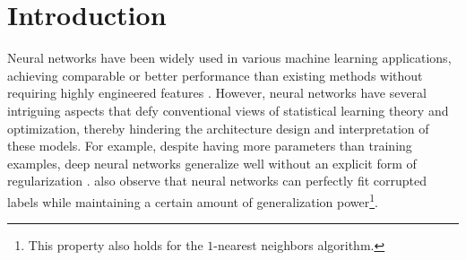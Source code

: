 \section{Introduction}

Neural networks have been widely used in various machine learning applications, achieving comparable or better performance than existing methods without requiring highly engineered features \citep{krizhevsky2012imagenet}. However, neural networks have several intriguing aspects that defy conventional views of statistical learning theory and optimization, thereby hindering the architecture design and interpretation of these models. For example, despite having more parameters than training examples, deep neural networks generalize well without an explicit form of regularization \citep{zhang2016understanding,neyshabur2017geometry,arora2019implicit}. \cite{zhang2016understanding} also observe that neural networks can perfectly fit corrupted labels while maintaining a certain amount of generalization power\footnote{This property also holds for the $1$-nearest neighbors algorithm.}.




